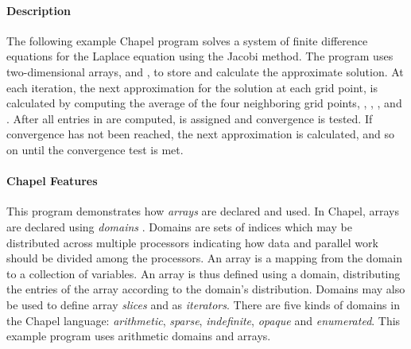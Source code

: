 \paragraph{Description}
The following example Chapel program solves a system of finite difference
equations for the Laplace equation using the Jacobi method.  The program uses
two-dimensional arrays,  and , to store and calculate the approximate
solution.  At each iteration, the next approximation for the solution at 
each grid point,  is calculated by computing the average of 
the four neighboring grid points,
, , , and .  
After all entries in  are computed,  is assigned 
and convergence is tested.  If convergence has not been reached, the next
approximation is calculated, and so on until the convergence test is met.

\paragraph{Chapel Features}
This program demonstrates how {\em arrays}  
are declared and used.  In Chapel, 
arrays are declared using {\em domains} .  
Domains are sets of indices which may be distributed
across multiple processors indicating how data and parallel work should
be divided among the processors.  An array is a mapping from the domain
to a collection of variables.  An array is thus defined using a domain, distributing
the entries of the array according to the domain's distribution.
Domains may also be used to define array {\em slices} and as {\em iterators}.
There are five kinds of domains in
the Chapel language:
  {\em arithmetic}, {\em sparse}, {\em indefinite},
{\em opaque} and {\em enumerated}.  This example program uses arithmetic domains
and arrays.  

